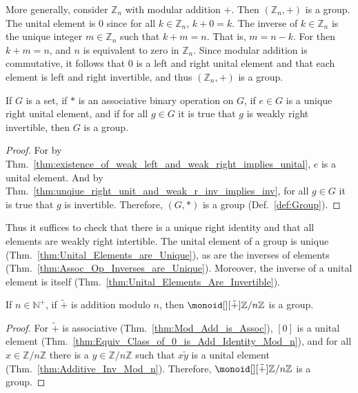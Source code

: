     \begin{example}
        More generally, consider $\mathbb{Z}_{n}$ with modular addition $+$.
        Then $(\mathbb{Z}_{n},+)$ is a group. The unital element is $0$ since
        for all $k\in\mathbb{Z}_{n}$, $k+0=k$. The inverse of
        $k\in\mathbb{Z}_{n}$ is the unique integer $m\in\mathbb{Z}_{n}$ such
        that $k+m=n$. That is, $m=n-k$. For then $k+m=n$, and $n$ is equivalent
        to zero in $\mathbb{Z}_{n}$. Since modular addition is commutative, it
        follows that $0$ is a left and right unital element and that each
        element is left and right invertible, and thus $(\mathbb{Z}_{n},+)$ is a
        group.
    \end{example}
    \begin{theorem}
        If $G$ is a set, if $*$ is an associative binary operation on $G$, if
        $e\in{G}$ is a unique right unital element, and if for all $g\in{G}$ it
        is true that $g$ is weakly right invertible, then $G$ is a group.
    \end{theorem}
    \begin{proof}
        For by
        Thm.~\ref{thm:existence_of_weak_left_and_weak_right_implies_unital},
        $e$ is a unital element. And by
        Thm.~\ref{thm:unqiue_right_unit_and_weak_r_inv_implies_inv}, for all
        $g\in{G}$ it is true that $g$ is invertible. Therefore, $(G,*)$ is a
        group (Def.~\ref{def:Group}).
    \end{proof}
    Thus it suffices to check that there is a unique right identity and that all
    elements are weakly right intertible. The unital element of a group is
    unique (Thm.~\ref{thm:Unital_Elements_are_Unique}), as are the inverses of
    elements (Thm.~\ref{thm:Assoc_Op_Inverses_are_Unique}). Moreover, the
    inverse of a unital element is itself
    (Thm.~\ref{thm:Unital_Elements_Are_Invertible}).
    \begin{theorem}
        If $n\in\mathbb{N}^{+}$, if $\tilde{+}$ is addition modulo $n$,
        then $\monoid[][\tilde{+}]{\mathbb{Z}/n\mathbb{Z}}$ is a group.
    \end{theorem}
    \begin{proof}
        For $\tilde{+}$ is associative (Thm.~\ref{thm:Mod_Add_is_Assoc}),
        $[0]$ is a unital element
        (Thm.~\ref{thm:Equiv_Class_of_0_is_Add_Identity_Mod_n}), and
        for all $x\in\mathbb{Z}/n\mathbb{Z}$ there is a
        $y\in\mathbb{Z}/n\mathbb{Z}$ such that $x\tilde{y}$ is a unital
        element (Thm.~\ref{thm:Additive_Inv_Mod_n}). Therefore,
        $\monoid[][\tilde{+}]{\mathbb{Z}/n\mathbb{Z}}$ is a group.
    \end{proof}

